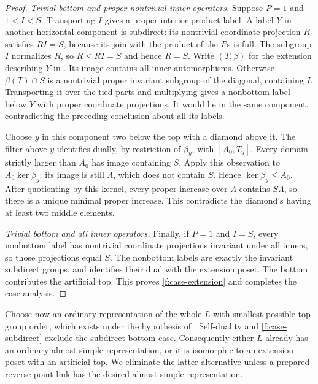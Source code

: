 \begin{proof}
\emph{Trivial bottom and proper nontrivial inner operators.}
Suppose $P=1$ and $1<I<S$. Transporting $I$ gives a proper interior product
label. A label $Y$ in another horizontal component is subdirect: its
nontrivial coordinate projection $R$ satisfies $RI=S$, because its join
with the product of the $I$'s is full. The subgroup $I$ normalizes $R$,
so $R\trianglelefteq RI=S$ and hence $R=S$.
Write $(T,\beta)$ for the extension describing $Y$ in
. Its image contains all inner
automorphisms. Otherwise $\beta(T)\cap S$ is a nontrivial proper invariant
subgroup of the diagonal, containing $I$. Transporting it over the tied
parts and multiplying gives a nonbottom label below $Y$ with proper
coordinate projections. It would lie in the same component, contradicting
the preceding conclusion about all its labels.

Choose $y$ in this component two below the top with a diamond above it.
The filter above $y$ identifies dually, by restriction of $\beta_y$, with
$[A_0,T_y]$. Every domain strictly larger than $A_0$ has image containing
$S$. Apply this observation to $A_0\ker\beta_y$: its image is still
$\Lambda$, which does not contain $S$. Hence $\ker\beta_y\le A_0$.
After quotienting by this kernel, every proper increase over $\Lambda$
contains $S\Lambda$, so there is a unique minimal proper increase. This
contradicts the diamond's having at least two middle elements.

\emph{Trivial bottom and all inner operators.}
Finally, if $P=1$ and $I=S$, every nonbottom label has nontrivial coordinate
projections invariant under all inners, so those projections equal $S$.
The nonbottom labels are exactly the invariant subdirect groups, and
 identifies their dual with the extension
poset. The bottom contributes the artificial top. This proves
\ref{f:case-extension} and completes the case analysis.
\end{proof}

Choose now an ordinary representation of the whole $L$ with smallest
possible top-group order, which exists under the hypothesis of
. Self-duality and
\ref{f:case-subdirect} exclude the subdirect-bottom
case. Consequently either $L$ already has an ordinary almost simple
representation, or it is isomorphic to an extension poset with an artificial
top. We eliminate the latter alternative unless a prepared reverse point
link has the desired almost simple representation.

